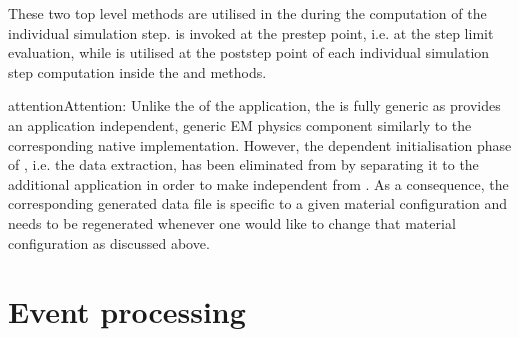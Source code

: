 \documentclass[letterpaper,10pt,english]{sphinxmanual}
\begin{document}
\sphinxAtStartPar
These two top level methods are utilised in the {\hyperref[\detokenize{IntroAndInstall/components:stepping-loop}]{}} during the computation of the individual simulation step.  is invoked
at the pre\sphinxhyphen{}step point, i.e. at the step limit evaluation, while  is utilised at the post\sphinxhyphen{}step point of each individual simulation step
computation inside the {\hyperref[\detokenize{Simulation/SimulationCodeDoc:_CPPv4N12SteppingLoop12GammaStepperER13G4HepEmTLDataR12G4HepEmStateR10TrackStackR8GeometryR7Resultsi}]{}} and {\hyperref[\detokenize{Simulation/SimulationCodeDoc:_CPPv4N12SteppingLoop15ElectronStepperER13G4HepEmTLDataR12G4HepEmStateR10TrackStackR8GeometryR7Resultsi}]{}} methods.

\begin{sphinxadmonition}{attention}{Attention:}
\sphinxAtStartPar
Unlike the {\hyperref[\detokenize{IntroAndInstall/components:geometry}]{}} of the application, the {\hyperref[\detokenize{IntroAndInstall/components:physics}]{}} is fully generic as  provides an application independent, generic
EM physics component similarly to the corresponding native  implementation. However, the  dependent initialisation
phase of , i.e. the data extraction, has been eliminated from  by separating it to the additional 
application in order to make  independent from . As a consequence, the corresponding generated data file is specific to a given
material configuration and needs to be re\sphinxhyphen{}generated whenever one would like to change that material configuration as discussed above.
\end{sphinxadmonition}


\section{Event processing}
\label{\detokenize{IntroAndInstall/components:event-processing}}
\end{document}
